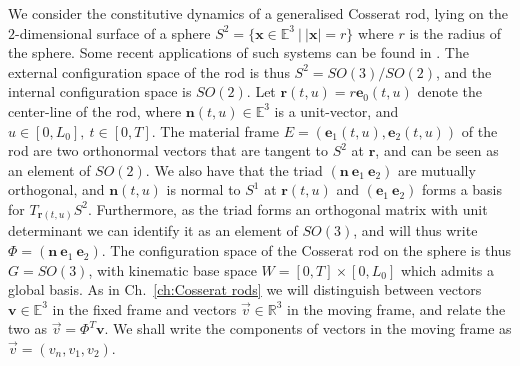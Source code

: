 We consider the constitutive dynamics of a generalised Cosserat rod, lying on the $2$-dimensional surface of a sphere $S^2 = \{ \mathbf{x} \in \mathbb{E}^3 \ |\ |\mathbf{x}| = r \}$ where $r$ is the radius of the sphere. Some recent applications of such systems can be found in \citep{mannaEmergentTopologicalPhenomena2019, hsuActivityinducedPolarPatterns2022}. The external configuration space of the rod is thus $S^2 = SO(3) / SO(2)$, and the internal configuration space is $SO(2)$. Let $\mathbf{r}(t,u) = r \mathbf{e}_0(t,u)$ denote the center-line of the rod, where $\mathbf{n}(t,u) \in \mathbb{E}^3$ is a unit-vector, and $u \in [0, L_0],\ t \in [0, T]$. The material frame $E = (\mathbf{e}_1(t,u), \mathbf{e}_2(t,u))$ of the rod are two orthonormal vectors that are tangent to $S^2$ at $\mathbf{r}$, and can be seen as an element of $SO(2)$. We also have that the triad $(\mathbf{n}\ \mathbf{e}_1\ \mathbf{e}_2)$ are mutually orthogonal, and $\mathbf{n}(t,u)$ is normal to $S^1$ at $\mathbf{r}(t,u)$ and $(\mathbf{e}_1\ \mathbf{e}_2)$ forms a basis for $T_{\mathbf{r}(t,u)} S^2$. Furthermore, as the triad forms an orthogonal matrix with unit determinant we can identify it as an element of $SO(3)$, and will thus write $\Phi = (\mathbf{n}\ \mathbf{e}_1\ \mathbf{e}_2)$. The configuration space of the Cosserat rod on the sphere is thus $G = SO(3)$, with kinematic base space $W = [0, T] \times [0, L_0]$ which admits a global basis. As in Ch.~\ref{ch:Cosserat rods} we will distinguish between vectors $\mathbf{v} \in \mathbb{E}^3$ in the fixed frame and vectors $\vec{v} \in \mathbb{R}^3$ in the moving frame, and relate the two as $\vec{v} = \Phi^T \mathbf{v}$. We shall write the components of vectors in the moving frame as $\vec{v} = (v_n, v_1, v_2)$.

